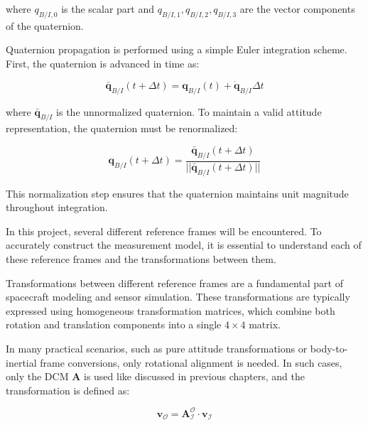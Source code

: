 \noindent where $q_{B/I,0}$ is the scalar part and $q_{B/I,1}, q_{B/I,2}, q_{B/I,3}$ are the vector components of the quaternion.
\vspace{0.5cm}

\noindent Quaternion propagation is performed using a simple Euler integration scheme. First, the quaternion is advanced in time as:

\begin{equation}
\bar{\mathbf{q}}_{B/I}(t + \Delta t) = \mathbf{q}_{B/I}(t) + \dot{\mathbf{q}}_{B/I} \Delta t
\end{equation}

\noindent where $\bar{\mathbf{q}}_{B/I}$ is the unnormalized quaternion. To maintain a valid attitude representation, the quaternion must be renormalized:

\begin{equation}
\mathbf{q}_{B/I}(t + \Delta t) = \frac{\bar{\mathbf{q}}_{B/I}(t + \Delta t)}{||\bar{\mathbf{q}}_{B/I}(t + \Delta t)||}
\end{equation}

\noindent This normalization step ensures that the quaternion maintains unit magnitude throughout integration.


In this project, several different reference frames will be encountered. To accurately construct the measurement model, it is 
essential to understand each of these reference frames and the transformations between them.


Transformations between different reference frames are a fundamental part of spacecraft modeling and sensor simulation. These 
transformations are typically expressed using homogeneous transformation matrices, which combine both rotation and translation components 
into a single $4 \times 4$ matrix.


In many practical scenarios, such as pure attitude transformations or body-to-inertial frame conversions, only rotational 
alignment is needed. In such cases, only the DCM $\mathbf{A}$ is used like discussed in previous chapters, and the transformation is defined as:

\begin{equation}
    \mathbf{v}_\mathcal{O} = \mathbf{A}_\mathcal{I}^\mathcal{O} \cdot \mathbf{v}_\mathcal{I}
\end{equation}


